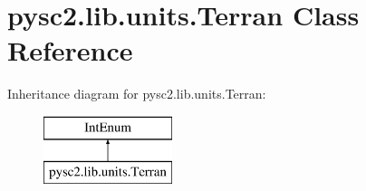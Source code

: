 \hypertarget{classpysc2_1_1lib_1_1units_1_1_terran}{}\section{pysc2.\+lib.\+units.\+Terran Class Reference}
\label{classpysc2_1_1lib_1_1units_1_1_terran}
Inheritance diagram for pysc2.\+lib.\+units.\+Terran\+:\begin{figure}[H]
\begin{center}
\leavevmode
\includegraphics[height=2.000000cm]{classpysc2_1_1lib_1_1units_1_1_terran}
\end{center}
\end{figure}
